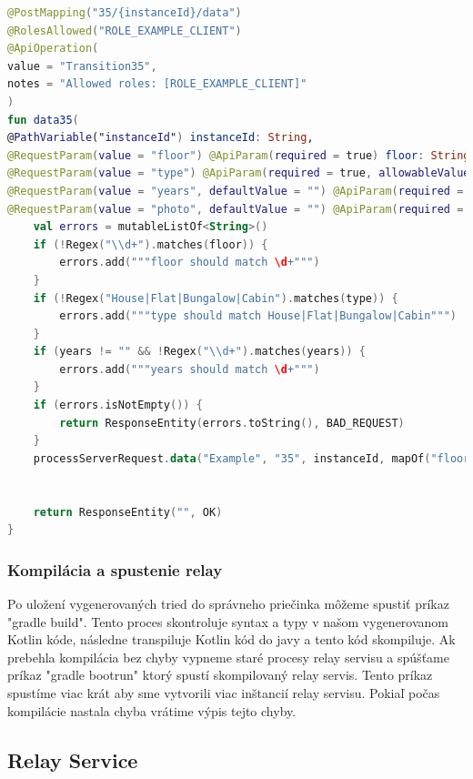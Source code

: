 \begin{lstlisting}[float, caption={Príklad vygenerovanej funkcie},label={alg:generated_endpoint},language=Kotlin]
@PostMapping("35/{instanceId}/data")
@RolesAllowed("ROLE_EXAMPLE_CLIENT")
@ApiOperation(
value = "Transition35",
notes = "Allowed roles: [ROLE_EXAMPLE_CLIENT]"
)
fun data35(
@PathVariable("instanceId") instanceId: String,
@RequestParam(value = "floor") @ApiParam(required = true) floor: String,
@RequestParam(value = "type") @ApiParam(required = true, allowableValues = """[House, Flat, Bungalow, Cabin]""") type: String,
@RequestParam(value = "years", defaultValue = "") @ApiParam(required = false) years: String,
@RequestParam(value = "photo", defaultValue = "") @ApiParam(required = false) photo: MultipartFile ): ResponseEntity<String> {
	val errors = mutableListOf<String>()
	if (!Regex("\\d+").matches(floor)) {
		errors.add("""floor should match \d+""")
	}
	if (!Regex("House|Flat|Bungalow|Cabin").matches(type)) {
		errors.add("""type should match House|Flat|Bungalow|Cabin""")
	}
	if (years != "" && !Regex("\\d+").matches(years)) {
		errors.add("""years should match \d+""")
	}
	if (errors.isNotEmpty()) {
		return ResponseEntity(errors.toString(), BAD_REQUEST)
	}
	processServerRequest.data("Example", "35", instanceId, mapOf("floor" to floor, "type" to type, "years" to years, "photo" to photo ))
	

	return ResponseEntity("", OK)
}
\end{lstlisting}

\subsubsection{Kompilácia a spustenie relay}

Po uložení vygenerovaných tried do správneho priečinka môžeme spustiť príkaz "gradle build". Tento proces skontroluje syntax a typy v našom vygenerovanom Kotlin kóde, následne transpiluje Kotlin kód do javy a tento kód skompiluje. Ak prebehla kompilácia bez chyby vypneme staré procesy relay servisu a spúšťame príkaz "gradle bootrun" ktorý spustí skompilovaný relay servis. Tento príkaz spustíme viac krát aby sme vytvorili viac inštancií relay servisu. Pokiaľ počas kompilácie nastala chyba vrátime výpis tejto chyby.

\subsection{Relay Service}

